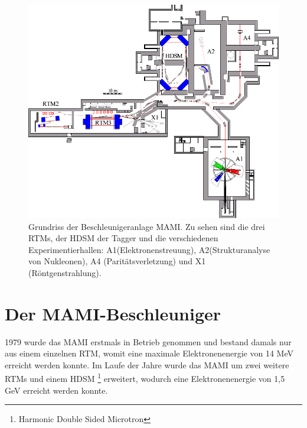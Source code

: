 \documentclass[a4paper,11pt,oneside,final,german,openbib,pdftex]{scrbook}
\begin{document}
\begin{figure}[h]
	
	\includegraphics{grundriss}
	\caption{Grundriss der Beschleunigeranlage MAMI. Zu sehen sind die drei RTMs, der HDSM der Tagger und die verschiedenen Experimentierhallen: A1(Elektronenstreuung), A2(Strukturanalyse von Nukleonen), A4 (Parit\"atsverletzung) und X1 (R\"ontgenstrahlung). \cite{KPh07}}
	\label{fig.grundriss_anlage}
\end{figure}


\section{Der MAMI-Beschleuniger}
1979 wurde das MAMI erstmals in Betrieb genommen und bestand damals nur aus einem einzelnen RTM, womit eine maximale Elektronenenergie von 14 MeV erreicht werden konnte. 
Im Laufe der Jahre wurde das MAMI um zwei weitere RTMs und einem HDSM \footnote{Harmonic Double Sided Microtron} erweitert, wodurch eine Elektronenenergie von 1,5 GeV erreicht werden konnte.\cite{KPh11G} 
\newline
\end{document}
